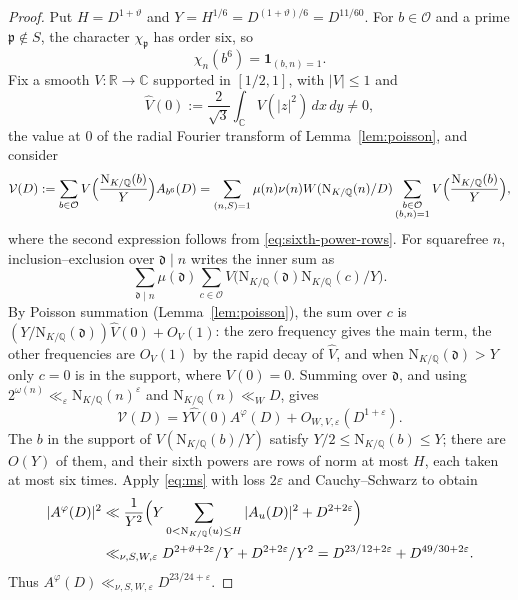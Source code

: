 \documentclass[11pt,a4paper]{article}
\numberwithin{equation}{section}
\numberwithin{figure}{section}
\theoremstyle{definition}
\theoremstyle{remark}
\newcommand{\Q}{\mathbb Q}
\newcommand{\R}{\mathbb R}
\newcommand{\NK}{\mathrm N_{K/\Q}}
\newcommand{\C}{\mathbb C}
\newcommand{\OO}{\mathcal O}
\newcommand{\ind}{\mathbf1}
\newcommand{\dd}{\,d}
\begin{document}
\begin{proof}
Put $H=D^{1+\vartheta}$ and
$Y=H^{1/6}=D^{(1+\vartheta)/6}=D^{11/60}$. For $b\in\OO$ and a prime
$\mathfrak p\notin S$, the character $\chi_{\mathfrak p}$ has order six, so
\begin{equation}\label{eq:sixth-power-rows}
 \chi_n(b^6)=\ind_{(b,n)=1}.
\end{equation}
Fix a smooth $V:\R\to\C$ supported in $[1/2,1]$, with $|V|\le1$ and
\[
 \widehat V(0):=\frac2{\sqrt3}\int_{\C}V(|z|^2)\dd x\dd y\ne0,
\]
the value at $0$ of the radial Fourier transform of Lemma~\ref{lem:poisson}, and consider
\[
 \mathcal V(D):=\sum_{b\in\OO}V\Bigl(\frac{\NK(b)}Y\Bigr)A_{b^6}(D)
 =\sum_{(n,S)=1}\mu(n)\nu(n)W(\NK(n)/D)
 \sum_{\substack{b\in\OO\\(b,n)=1}}V\Bigl(\frac{\NK(b)}Y\Bigr),
\]
where the second expression follows from \eqref{eq:sixth-power-rows}.
For squarefree $n$, inclusion--exclusion over $\mathfrak d\mid n$ writes the
inner sum as
\[
 \sum_{\mathfrak d\mid n}\mu(\mathfrak d)\sum_{c\in\OO}V\bigl(\NK(\mathfrak d)\NK(c)/Y\bigr).
\]
By Poisson summation (Lemma~\ref{lem:poisson}), the sum over $c$ is
$(Y/\NK(\mathfrak d))\widehat V(0)+O_V(1)$: the zero frequency gives the main term, the other
frequencies are $O_V(1)$ by the rapid decay of $\widehat V$, and when $\NK(\mathfrak d)>Y$ only
$c=0$ is in the support, where $V(0)=0$. Summing over $\mathfrak d$, and using
$2^{\omega(n)}\ll_\varepsilon\NK(n)^\varepsilon$ and $\NK(n)\ll_W D$, gives
\begin{equation}\label{eq:extraction-evaluation}
 \mathcal V(D)=Y\widehat V(0)A^\varphi(D)+O_{W,V,\varepsilon}(D^{1+\varepsilon}).
\end{equation}
The $b$ in the support of $V(\NK(b)/Y)$ satisfy $Y/2\le\NK(b)\le Y$; there are $O(Y)$ of them,
and their sixth powers are rows of norm at most $H$, each taken at most six times. Apply
\eqref{eq:ms} with loss $2\varepsilon$ and Cauchy--Schwarz to obtain
\begin{align}
 |A^\varphi(D)|^2
 &\ll \frac1{Y^2}\Bigl(Y\sum_{0<\NK(u)\le H}|A_u(D)|^2+D^{2+2\varepsilon}\Bigr)\nonumber\\
 &\ll_{\nu,S,W,\varepsilon}D^{2+\vartheta+2\varepsilon}/Y+D^{2+2\varepsilon}/Y^2
   =D^{23/12+2\varepsilon}+D^{49/30+2\varepsilon}.
                                                        \label{eq:prime-extract}
\end{align}
Thus $A^\varphi(D)\ll_{\nu,S,W,\varepsilon}D^{23/24+\varepsilon}$.
\end{proof}
\end{document}
